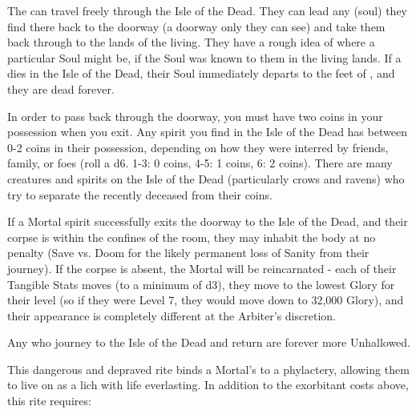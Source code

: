 The  can travel freely through the Isle of the Dead.  They can lead any  (soul) they find there back to the doorway (a doorway only they can see) and take them back through to the lands of the living.  They have a rough idea of where a particular Soul might be, if the Soul was known to them in the living lands. If a  dies in the Isle of the Dead, their Soul immediately departs to the feet of \TheAuthority, and they are dead forever.  

In order to pass back through the doorway, you must have two coins in your possession when you exit.  Any spirit you find in the Isle of the Dead has between 0-2 coins in their possession, depending on how they were interred by friends, family, or foes (roll a d6.  1-3: 0 coins, 4-5: 1 coins, 6: 2 coins).  There are many creatures and spirits on the Isle of the Dead (particularly crows and ravens) who try to separate the recently deceased from their coins.

If a Mortal spirit successfully exits the doorway to the Isle of the Dead, and their corpse is within the confines of the room, they may inhabit the body at no penalty (Save vs. Doom for the likely permanent loss of Sanity \UD from their journey).  If the corpse is absent, the Mortal will be reincarnated - each of their Tangible Stats moves \DCDOWN (to a minimum of d3), they move to the lowest Glory for their level (so if they were Level 7, they would move down to 32,000 Glory), and their appearance is completely different at the Arbiter's discretion.

Any who journey to the Isle of the Dead and return are forever more Unhallowed. 

\newpage

\OCCULT[
  Name=Lichdom,
  Link=occultism-lichdom,
  Success=2 (plus see below),
  Cost=66{,}666\AU
]

This dangerous and depraved rite binds a Mortal's  to a phylactery, allowing them to live on as a lich with life everlasting. In addition to the exorbitant costs above, this rite requires:






